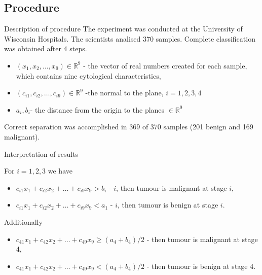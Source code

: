 \documentclass{beamer}
\begin{document}
\subsection{Procedure}
\begin{frame}[allowframebreaks]{Description of procedure}
The experiment was conducted at the University of Wisconsin Hospitals. The scientists analised 370 samples. Complete classification was obtained after 4 steps.
\begin{block}

\begin{itemize}
\item $(x_1,x_2, \ldots, x_9) \in \mathbb{R}^9$ - the vector of real numbers created for each sample, which contains nine cytological characteristics,
\item  $(c_{i1},c_{i2}, \ldots, c_{i9}) \in \mathbb{R}^9$ -the normal to the plane, $i=1,2,3,4$
\item $a_i,b_i$- the distance from the origin to the planes  $\in \mathbb{R}^9$
\end{itemize}

\end{block}
Correct separation was accomplished in 369 of 370 samples (201 benign
and 169 malignant).
\begin{block}{Interpretation of results}

For $i=1,2,3$ we have
\begin{itemize}
\item $c_{i1}x_1+c_{i2}x_2+\ldots+c_{i9}x_9>b_i$ - $i$, then  tumour is malignant at stage $i$,
\item $c_{i1}x_1+c_{i2}x_2+\ldots+c_{i9}x_9<a_1$ - $i$, then  tumour is benign at
stage $i$.
\end{itemize}

Additionally

\begin{itemize}
\item $c_{41}x_1+c_{42}x_2+\ldots+c_{49}x_9\geq(a_4+b_4)/2$ - then tumour is malignant at stage 4,
\item $c_{41}x_1+c_{42}x_2+\ldots+c_{49}x_9<(a_4+b_4)/2$ - then tumour is benign at stage 4.
\end{itemize}


\end{block}



\end{frame}
\end{document}
